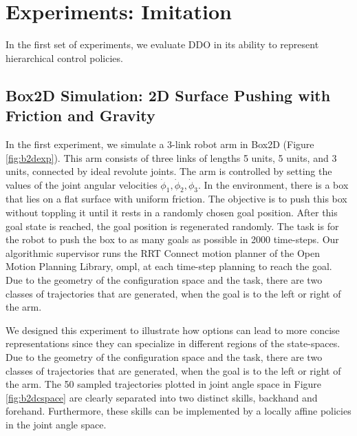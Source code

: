 \section{Experiments: Imitation}
In the first set of experiments, we evaluate DDO in its ability to represent hierarchical control policies. 

\subsection*{Box2D Simulation: 2D Surface Pushing with Friction and Gravity}
In the first experiment, we simulate a 3-link robot arm in Box2D (Figure \ref{fig:b2dexp}). This arm consists of three links of lengths 5 units, 5 units, and 3 units, connected by ideal revolute joints. The arm is controlled by setting the values of the joint angular velocities $\dot{\phi}_1, \dot{\phi}_2, \dot{\phi}_3$. In the environment, there is a box that lies on a flat surface with uniform friction. The objective is to push this box without toppling it until it rests in a randomly chosen goal position. After this goal state is reached, the goal position is regenerated randomly.
The task is for the robot to push the box to as many goals as possible in 2000 time-steps.
Our algorithmic supervisor runs the RRT Connect motion planner of the Open Motion Planning Library, \textsf{ompl}, at each time-step planning to reach the goal. 
Due to the geometry of the configuration space and the task, there are two classes of trajectories that are generated, when the goal is to the left or right of the arm. 

We designed this experiment to illustrate how options can lead to more concise representations since they can specialize in different regions of the state-spaces.
Due to the geometry of the configuration space and the task, there are two classes of trajectories that are generated, when the goal is to the left or right of the arm.
The 50 sampled trajectories plotted in joint angle space in Figure \ref{fig:b2dcspace} are clearly separated into two distinct skills, backhand and forehand. 
Furthermore, these skills can be implemented by a locally affine policies in the joint angle space.

